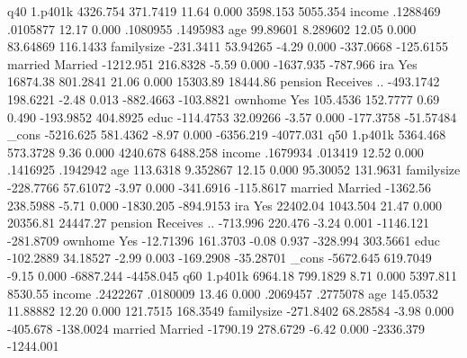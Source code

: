 q40          {\VBAR}
     1.p401k {\VBAR}   4326.754   371.7419    11.64   0.000     3598.153    5055.354
      income {\VBAR}   .1288469   .0105877    12.17   0.000     .1080955    .1495983
         age {\VBAR}   99.89601   8.289602    12.05   0.000     83.64869    116.1433
  familysize {\VBAR}  -231.3411   53.94265    -4.29   0.000    -337.0668   -125.6155
             {\VBAR}
     married {\VBAR}
    Married  {\VBAR}  -1212.951   216.8328    -5.59   0.000    -1637.935    -787.966
             {\VBAR}
         ira {\VBAR}
        Yes  {\VBAR}   16874.38   801.2841    21.06   0.000     15303.89    18444.86
             {\VBAR}
     pension {\VBAR}
Receives ..  {\VBAR}  -493.1742   198.6221    -2.48   0.013    -882.4663   -103.8821
             {\VBAR}
     ownhome {\VBAR}
        Yes  {\VBAR}   105.4536   152.7777     0.69   0.490    -193.9852    404.8925
        educ {\VBAR}  -114.4753   32.09266    -3.57   0.000    -177.3758   -51.57484
       _cons {\VBAR}  -5216.625   581.4362    -8.97   0.000    -6356.219   -4077.031
q50          {\VBAR}
     1.p401k {\VBAR}   5364.468   573.3728     9.36   0.000     4240.678    6488.258
      income {\VBAR}   .1679934    .013419    12.52   0.000     .1416925    .1942942
         age {\VBAR}   113.6318   9.352867    12.15   0.000     95.30052    131.9631
  familysize {\VBAR}  -228.7766   57.61072    -3.97   0.000    -341.6916   -115.8617
             {\VBAR}
     married {\VBAR}
    Married  {\VBAR}   -1362.56   238.5988    -5.71   0.000    -1830.205   -894.9153
             {\VBAR}
         ira {\VBAR}
        Yes  {\VBAR}   22402.04   1043.504    21.47   0.000     20356.81    24447.27
             {\VBAR}
     pension {\VBAR}
Receives ..  {\VBAR}   -713.996    220.476    -3.24   0.001    -1146.121   -281.8709
             {\VBAR}
     ownhome {\VBAR}
        Yes  {\VBAR}  -12.71396   161.3703    -0.08   0.937     -328.994    303.5661
        educ {\VBAR}  -102.2889   34.18527    -2.99   0.003    -169.2908   -35.28701
       _cons {\VBAR}  -5672.645   619.7049    -9.15   0.000    -6887.244   -4458.045
q60          {\VBAR}
     1.p401k {\VBAR}    6964.18   799.1829     8.71   0.000     5397.811     8530.55
      income {\VBAR}   .2422267   .0180009    13.46   0.000     .2069457    .2775078
         age {\VBAR}   145.0532   11.88882    12.20   0.000     121.7515    168.3549
  familysize {\VBAR}  -271.8402   68.28584    -3.98   0.000     -405.678   -138.0024
             {\VBAR}
     married {\VBAR}
    Married  {\VBAR}   -1790.19   278.6729    -6.42   0.000    -2336.379   -1244.001
